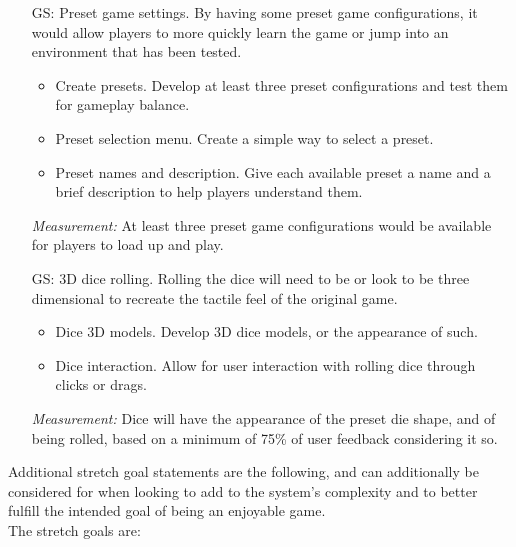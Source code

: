 \begin{itemize}
	\item[GS\refstepcounter{goalnum}\thegoalnum \label{G_presets}:] Preset game settings. By having some preset game configurations, it would allow players to more quickly learn the game or jump into an environment that has been tested.
	\begin{itemize}
        \item Create presets. Develop at least three preset configurations and test them for gameplay balance.
        \item Preset selection menu. Create a simple way to select a preset.
        \item Preset names and description. Give each available preset a name and a brief description to help players understand them.
    \end{itemize}
	\textit{Measurement:} At least three preset game configurations would be available for players to load up and play.
	
	\item[GS\refstepcounter{goalnum}\thegoalnum \label{G_3D}:] 3D dice rolling. Rolling the dice will need to be or look to be three dimensional to recreate the tactile feel of the original game.
	\begin{itemize}
        \item Dice 3D models. Develop 3D dice models, or the appearance of such.
        \item Dice interaction. Allow for user interaction with rolling dice through clicks or drags.
    \end{itemize}
	\textit{Measurement:} Dice will have the appearance of the preset die shape, and of being rolled, based on a minimum of 75\% of user feedback considering it so.

\end{itemize}

\vspace{50px}
Additional stretch goal statements are the following, and can additionally be considered for when looking to add to the system's complexity and to better fulfill the intended goal of being an enjoyable game.\\
The stretch goals are:

